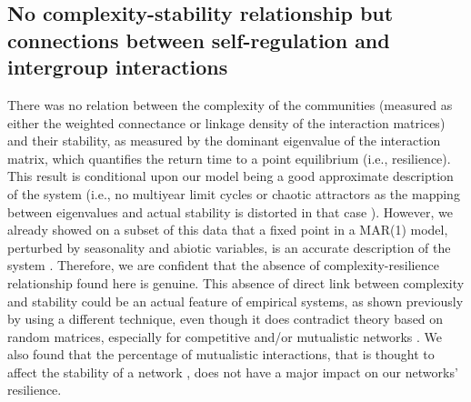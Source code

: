\documentclass[10pt]{article}
\begin{document}
\subsection*{No complexity-stability relationship but connections between self-regulation
and intergroup interactions}

There was no relation between the complexity of the communities (measured
as either the weighted connectance or linkage density of the interaction
matrices) and their stability, as measured by the dominant eigenvalue
of the interaction matrix, which quantifies the return time to a point
equilibrium (i.e., resilience). This result is conditional upon our
model being a good approximate description of the system (i.e., no
multiyear limit cycles or chaotic attractors as the mapping between
eigenvalues and actual stability is distorted in that case \citealp{certain_how_2018}).
However, we already showed on a subset of this data that a fixed point
in a MAR(1) model, perturbed by seasonality and abiotic variables,
is an accurate description of the system \citep{barraquand_coastal_2018}.
Therefore, we are confident that the absence of complexity-resilience relationship
found here is genuine. This absence of direct link between complexity
and stability could be an actual feature of empirical systems, as
shown previously by \citet{jacquet_no_2016} using a different technique,
even though it does contradict theory
based on random matrices, especially for competitive and/or mutualistic
networks \citep{allesina_stability_2012}. We also found that the
percentage of mutualistic interactions, that is thought to affect
the stability of a network \citep{mougi2012diversity,coyte_ecology_2015,garcia-callejas_multiple_2018},
does not have a major impact on our networks' resilience.
\end{document}
